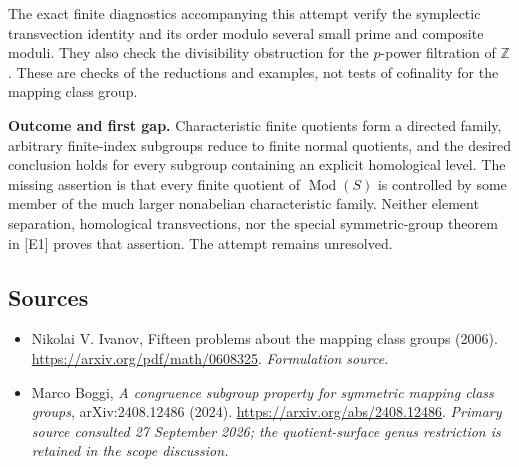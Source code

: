 \documentclass[11pt]{article}
\begin{document}
The exact finite diagnostics accompanying this attempt verify the symplectic transvection identity and its order modulo several small prime and composite moduli. They also check the divisibility obstruction for the $p$-power filtration of $\mathbb Z$. These are checks of the reductions and examples, not tests of cofinality for the mapping class group.

\textbf{Outcome and first gap.} Characteristic finite quotients form a directed family, arbitrary finite-index subgroups reduce to finite normal quotients, and the desired conclusion holds for every subgroup containing an explicit homological level. The missing assertion is that every finite quotient of $\operatorname{Mod}(S)$ is controlled by some member of the much larger nonabelian characteristic family. Neither element separation, homological transvections, nor the special symmetric-group theorem in [E1] proves that assertion. The attempt remains unresolved.

\subsection{Sources}
\begin{itemize}
\item[S1]Nikolai V. Ivanov, Fifteen problems about the mapping class groups (2006).
\url{https://arxiv.org/pdf/math/0608325}.
\textit{Formulation source.}
\item[E1]Marco Boggi, \emph{A congruence subgroup property for symmetric mapping class groups}, arXiv:2408.12486 (2024).
\url{https://arxiv.org/abs/2408.12486}.
\textit{Primary source consulted 27 September 2026; the quotient-surface genus restriction is retained in the scope discussion.}
\end{itemize}
\end{document}
